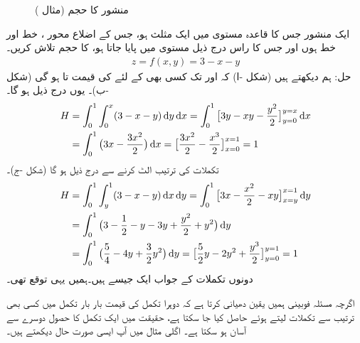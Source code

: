 \begin{figure}
\begin{subfigure}{0.25\textwidth}
\caption{}
\end{subfigure}\hfill
\begin{subfigure}{0.25\textwidth}
\centering
{}
\caption{}
\end{subfigure}
\caption{منشور کا حجم (مثال )}
\label{شکل_مثال_بالکثرت_فوبینی_مثلث}
\end{figure}

ایک منشور جس کا قاعدہ  مستوی  میں ایک مثلث   ہو،  جس کے اضلاع محور ، خط  اور خط  ہوں اور جس کا راس  درج ذیل مستوی میں پایا جاتا ہو، کا حجم تلاش کریں۔
\begin{align*}
z=f(x,y)=3-x-y
\end{align*}
حل:\quad
ہم دیکھتے ہیں (شکل -ا)  کہ   اور  تک کسی بھی   کے لئے  کی قیمت  تا  ہو گی (شکل -ب)۔ یوں درج ذیل ہو گا۔
\begin{align*}
H&=\int_0^1\int_0^x(3-x-y)\dif y\dif x=\int_0^1\big[3y-xy-\frac{y^2}{2}\big]_{y=0}^{y=x}\dif x\\
&=\int_0^1\big(3x-\frac{3x^2}{2}\big)\dif x=\big[\frac{3x^2}{2}-\frac{x^3}{2}\big]_{x=0}^{x=1}=1
\end{align*}
تکملات  کی ترتیب الٹ کرنے سے درج ذیل  ہو گا (شکل -ج)۔
\begin{align*}
H&=\int_0^1\int_y^1(3-x-y)\dif x\dif y=\int_0^1\big[3x-\frac{x^2}{2}-xy\big]_{x=y}^{x=1}\dif y\\
&=\int_0^1\big(3-\frac{1}{2}-y-3y+\frac{y^2}{2}+y^2\big)\dif y\\
&=\int_0^1\big(\frac{5}{4}-4y+\frac{3}{2}y^2\big)\dif y=\big[\frac{5}{2}y-2y^2+\frac{y^3}{2}\big]_{y=0}^{y=1}=1
\end{align*}
دونوں تکملات کے جواب ایک جیسے ہیں۔ہمیں یہی توقع تھی۔

اگرچہ مسئلہ فوبینی ہمیں یقین دھیانی  کرتا ہے کہ دوہرا تکمل کی قیمت    بار بار تکمل میں    کسی بھی ترتیب سے  تکملات لیتے ہوئے حاصل کیا جا سکتا ہے، حقیقت میں ایک تکمل کا حصول  دوسرے سے آسان ہو سکتا ہے۔ اگلی مثال میں آپ ایسی صورت حال دیکھتے ہیں۔

